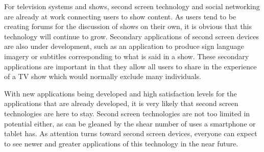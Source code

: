 \documentclass[11pt, oneside]{article}
\begin{document}
For television systems and shows, second screen technology and social networking are already at work connecting users to show content. As users tend to be creating forums for the discussion of shows on their own, it is obvious that this technology will continue to grow. Secondary applications of second screen devices are also under development, such as an application to produce sign language imagery or subtitles corresponding to what is said in a show. These secondary applications are important in that they allow all users to share in the experience of a TV show which would normally exclude many individuals.

With new applications being developed and high satisfaction levels for the applications that are already developed, it is very likely that second screen technologies are here to stay. Second screen technologies are not too limited in potential either, as can be gleaned by the shear number of uses a smartphone or tablet has. As attention turns toward second screen devices, everyone can expect to see newer and greater applications of this technology in the near future.

{}

\end{document}
